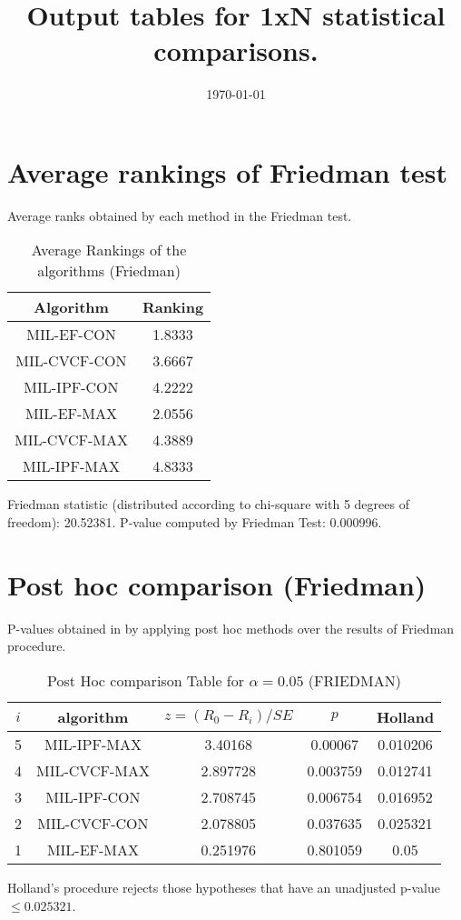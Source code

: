 \documentclass[a4paper,10pt]{article}
\title{Output tables for 1xN statistical comparisons.}
\author{}
\date{\today}
\begin{document}
\begin{landscape}
\pagestyle{empty}
\maketitle
\thispagestyle{empty}

\section{Average rankings of Friedman test}


Average ranks obtained by each method in the Friedman test.

\begin{table}[!htp]
\centering
\begin{tabular}{|c|c|}\hline
Algorithm&Ranking\\\hline
MIL-EF-CON&1.8333\\MIL-CVCF-CON&3.6667\\MIL-IPF-CON&4.2222\\MIL-EF-MAX&2.0556\\MIL-CVCF-MAX&4.3889\\MIL-IPF-MAX&4.8333\\\hline\end{tabular}
\caption{Average Rankings of the algorithms (Friedman)}
\end{table}

Friedman statistic (distributed according to chi-square with 5 degrees of freedom): 20.52381. \newline P-value computed by Friedman Test: 0.000996.\newline


\newpage

\section{Post hoc comparison (Friedman)}


P-values obtained in by applying post hoc methods over the results of Friedman procedure.

\begin{table}[!htp]
\centering\footnotesize
\begin{tabular}{ccccc}
$i$&algorithm&$z=(R_0 - R_i)/SE$&$p$&Holland\\
\hline5&MIL-IPF-MAX&3.40168&0.00067&0.010206\\4&MIL-CVCF-MAX&2.897728&0.003759&0.012741\\3&MIL-IPF-CON&2.708745&0.006754&0.016952\\2&MIL-CVCF-CON&2.078805&0.037635&0.025321\\1&MIL-EF-MAX&0.251976&0.801059&0.05\\\hline
\end{tabular}
\caption{Post Hoc comparison Table for $\alpha=0.05$ (FRIEDMAN)}
\end{table}Holland's procedure rejects those hypotheses that have an unadjusted p-value $\le0.025321$.



\end{landscape}
\end{document}
